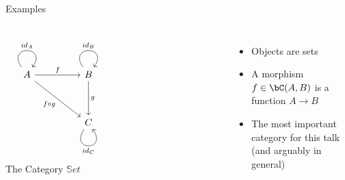 \begin{frame}[fragile]{Examples}
\begin{columns}
\[\begin{tikzcd}
	A && B \\
	\\
	&& C &&&&& {}
	\arrow["{id_A}", from=1-1, to=1-1, loop, in=55, out=125, distance=10mm]
	\arrow["{f}", from=1-1, to=1-3]
	\arrow["{f \circ g}"', from=1-1, to=3-3]
	\arrow["{id_B}", from=1-3, to=1-3, loop, in=55, out=125, distance=10mm]
	\arrow["{g}", from=1-3, to=3-3]
	\arrow["{id_C}"', from=3-3, to=3-3, loop, in=305, out=235, distance=10mm]
\end{tikzcd}\]
The Category $\mathbb{S}et$
\begin{itemize}
 \pause\item Objects are sets
 \pause\item A morphism $f \in \bC(A,B)$ is a function $A \to B$
 \pause\item The most important category for this talk (and arguably in general)
\end{itemize}
\end{columns}
\end{frame}
